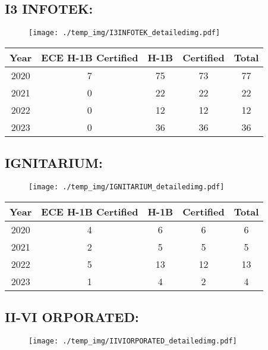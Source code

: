 \documentclass{article}%
\begin{document}
%
\newpage%
\subsection{I3 INFOTEK:}%
\label{subsec:I3INFOTEK}%
\label{I3INFOTEKdetailed}%


\begin{figure}[htbp]%
\centering%
\texttt{[image: ./temp\_img/I3INFOTEK\_detailedimg.pdf]}%
\end{figure}

%
\begin{longtable}{c|c|c|c|c}%
\hline%
Year&ECE H{-}1B Certified&H{-}1B&Certified&Total\\%
\hline%
2020&7&75&73&77\\%
\hline%
2021&0&22&22&22\\%
\hline%
2022&0&12&12&12\\%
\hline%
2023&0&36&36&36\\%
\hline%
\end{longtable}

%
\newpage%
\subsection{IGNITARIUM:}%
\label{subsec:IGNITARIUM}%
\label{IGNITARIUMdetailed}%


\begin{figure}[htbp]%
\centering%
\texttt{[image: ./temp\_img/IGNITARIUM\_detailedimg.pdf]}%
\end{figure}

%
\begin{longtable}{c|c|c|c|c}%
\hline%
Year&ECE H{-}1B Certified&H{-}1B&Certified&Total\\%
\hline%
2020&4&6&6&6\\%
\hline%
2021&2&5&5&5\\%
\hline%
2022&5&13&12&13\\%
\hline%
2023&1&4&2&4\\%
\hline%
\end{longtable}

%
\newpage%
\subsection{II{-}VI ORPORATED:}%
\label{subsec:II{-}VIORPORATED}%
\label{IIVIORPORATEDdetailed}%


\begin{figure}[htbp]%
\centering%
\texttt{[image: ./temp\_img/IIVIORPORATED\_detailedimg.pdf]}%
\end{figure}
\end{document}
